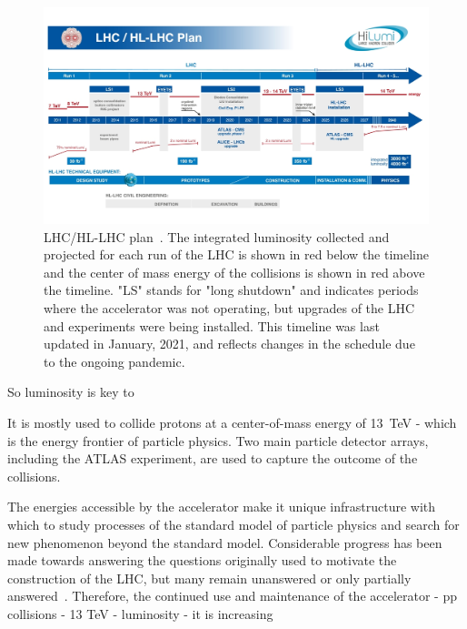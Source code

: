 \begin{figure}
    \centering
    \includegraphics[width = \textwidth]{figures/HL-LHC-updated-January-2021_small.jpg}
    \caption{LHC/HL-LHC plan~\cite{hl-lhc_plan_picture_website}. The integrated luminosity collected and projected for each run of the LHC is shown in red below the timeline and the center of mass energy of the collisions is shown in red above the timeline. "LS" stands for "long shutdown" and indicates periods where the accelerator was not operating, but upgrades of the LHC and experiments were being installed. This timeline was last updated in January, 2021, and reflects changes in the schedule due to the ongoing pandemic. }
    \label{fig:hl-lhc}
\end{figure}








So luminosity is key to 

It is mostly used to collide protons at a center-of-mass energy of \SI{13}{\tera\electronvolt} - which is the energy frontier of particle physics. Two main particle detector arrays, including the ATLAS experiment, are used to capture the outcome of the collisions. 



The energies accessible by the accelerator make it unique infrastructure with which to study processes of the standard model of particle physics and search for new phenomenon beyond the standard model. Considerable progress has been made towards answering the questions originally used to motivate the construction of the LHC, but many remain unanswered or only partially answered~\cite{brianti_large_1984}. Therefore, the continued use and maintenance of the accelerator 
- pp collisions
- 13 TeV
- luminosity - it is increasing

